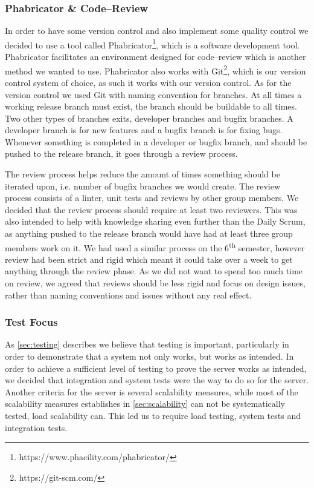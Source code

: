 \subsubsection{Phabricator \& Code--Review}
In order to have some version control and also implement some quality control we decided to use a tool called Phabricator\footnote{https://www.phacility.com/phabricator/}, which is a software development tool.
Phabricator facilitates an environment designed for code--review which is another method we wanted to use.
Phabricator also works with Git\footnote{https://git-scm.com/}, which is our version control system of choice, as such it works with our version control.
As for the version control we used Git with naming convention for branches.
At all times a working release branch must exist, the branch should be buildable to all times.
Two other types of branches exits, developer branches and bugfix branches.
A developer branch is for new features and a bugfix branch is for fixing bugs.
Whenever something is completed in a developer or bugfix branch, and should be pushed to the release branch, it goes through a review process.

The review process helps reduce the amount of times something should be iterated upon, i.e. number of bugfix branches we would create.
The review process consists of a linter, unit tests and reviews by other group members.
We decided that the review process should require at least two reviewers.
This was also intended to help with knowledge sharing even further than the Daily Scrum, as anything pushed to the release branch would have had at least three group members work on it.
We had used a similar process on the 6\textsuperscript{th} semester, however review had been strict and rigid which meant it could take over a week to get anything through the review phase.
As we did not want to spend too much time on review, we agreed that reviews should be less rigid and focus on design issues, rather than naming conventions and issues without any real effect.
\subsubsection{Test Focus}
As \cref{sec:testing} describes we believe that testing is important, particularly in order to demonstrate that a system not only works, but works as intended.
In order to achieve a sufficient level of testing to prove the server works as intended, we decided that integration and system tests were the way to do so for the server.
Another criteria for the server is several scalability measures, while most of the scalability measures establishes in \cref{sec:scalability} can not be systematically tested, load scalability can.
This led us to require load testing, system tests and integration tests.
